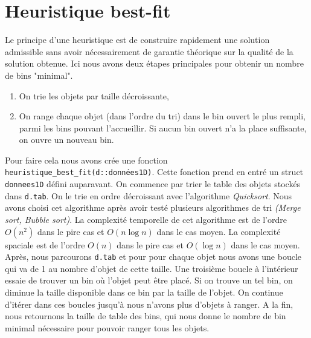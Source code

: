 \documentclass{article}
\begin{document}
\section{Heuristique best-fit}
    Le principe d’une heuristique est de construire rapidement une solution admissible sans avoir nécessairement de garantie théorique sur la qualité de la solution obtenue. Ici nous avons deux étapes principales pour obtenir un nombre de bins "minimal".
    \begin{enumerate}
        \item On trie les objets par taille décroissante,
        \item On range chaque objet (dans l’ordre du tri) dans le bin ouvert le plus rempli, parmi les bins pouvant l’accueillir. Si aucun bin ouvert n’a la place suffisante, on ouvre un nouveau bin.
    \end{enumerate}
    Pour faire cela nous avons crée une fonction \texttt{heuristique\_best\_fit(d::données1D)}.
    Cette fonction prend en entré un struct \texttt{donnees1D} défini auparavant. \newline
    On commence par trier le table des objets stockés dans \texttt{d.tab}. On le trie en ordre décroissant avec l'algorithme \textit{Quicksort}. Nous avons choisi cet algorithme après avoir testé plusieurs algorithmes de tri \textit{(Merge sort, Bubble sort)}. La complexité temporelle de cet algorithme est de l'ordre $O(n^2)$ dans le pire cas et $O(n\log n)$ dans le cas moyen. La complexité spaciale est de l'ordre $O(n)$ dans le pire cas et $O(\log n)$ dans le cas moyen. \newline
    Après, nous parcourons \texttt{d.tab} et pour pour chaque objet nous avons une boucle qui va de 1 au nombre d'objet de cette taille. Une troisième boucle à l'intérieur essaie de trouver un bin où l'objet peut être placé. Si on trouve un tel bin, on diminue la taille disponible dans ce bin par la taille de l'objet. On continue d'itérer dans ces boucles jusqu'à nous n'avons plus d'objets à ranger. A la fin, nous retournons la taille de table des bins, qui nous donne le nombre de bin minimal nécessaire pour pouvoir ranger tous les objets.
\end{document}
